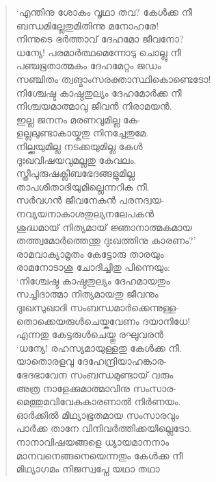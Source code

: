 \begin{verse}
‘എന്തിനു ശോകം വൃഥാ തവ? കേള്‍ക്ക നീ\\
ബന്ധമില്ലേതുമിതിന്നു മനോഹരേ!\\
നിന്നുടെ ഭര്‍ത്താവ് ദേഹമോ ജീവനോ?\\
ധന്യേ! പരമാര്‍ത്ഥമെന്നോടു ചൊല്ലു നീ\\
പഞ്ചഭൂതാത്മകം ദേഹമേറ്റം ജഡം\\
സഞ്ചിതം ത്വങ്മാംസരക്താസ്ഥികൊണ്ടെടോ!\\
നിശ്ചേഷ്ട കാഷ്ഠതുല്യം ദേഹമോര്‍ക്ക നീ\\
നിശ്ചയമാത്മാവു ജീവന്‍ നിരാമയന്‍.\\
ഇല്ല ജനനം മരണവുമില്ല കേ-\\
ളല്ലലുണ്ടാകായ്കതു നിനച്ചേതുമേ.\\
നില്ക്കയുമില്ല നടക്കയുമില്ല കേള്‍\\
ദുഃഖവിഷയവുമല്ലതു കേവലം.\\
സ്ത്രീപുരുഷക്ലീബഭേദങ്ങളുമില്ല\\
താപശീതാദിയുമില്ലെന്നറിക നീ.\\
സര്‍വഗന്‍ ജീവനേകന്‍ പരനദ്വയ-\\
നവ്യയനാകാശതുല്യനലേപകന്‍\\
ശുദ്ധമായ് നിത്യമായ് ജ്ഞാനാത്മകമായ\\
തത്ത്വമോര്‍ത്തെന്തു ദുഃഖത്തിനു കാരണം?’\\
രാമവാക്യാമൃതം കേട്ടോരു താരയും\\
രാമനോടാശു ചോദിച്ചിതു പിന്നെയും:\\
‘നിശ്ചേഷ്ട കാഷ്ഠതുല്യം ദേഹമായതും\\
സച്ചിദാത്മാ നിത്യമായതു ജീവനും\\
ദുഃഖസുഖാദി സംബന്ധമാര്‍ക്കെന്നുള്ള-\\
തൊക്കെയരുള്‍ചെയ്കവേണം ദയാനിധേ!\\
എന്നതു കേട്ടരുള്‍ചെയ്തു രഘുവരന്‍\\
‘ധന്യേ! രഹസ്യമായുള്ളതു കേള്‍ക്ക നീ.\\
യാതൊരളവു ദേഹേന്ദ്രിയാഹങ്കാര-\\
ഭേദഭാവേന സംബന്ധമുണ്ടായ് വരും\\
അത്ര നാളേക്കുമാത്മാവിനു സംസാര-\\
മെത്തുമവിവേകകാരണാല്‍ നിര്‍ണയം.\\
ഓര്‍ക്കില്‍ മിഥ്യാഭൂതമായ സംസാരവും\\
പാര്‍ക്ക താനേ വിനിവര്‍ത്തിക്കയില്ലെടോ.\\
നാനാവിഷയങ്ങളെ ധ്യായമാനനാം\\
മാനവനെങ്ങനെയെന്നതും കേള്‍ക്ക നീ\\
മിഥ്യാഗമം നിജസ്വപ്നേ യഥാ തഥാ\\

\end{verse}
